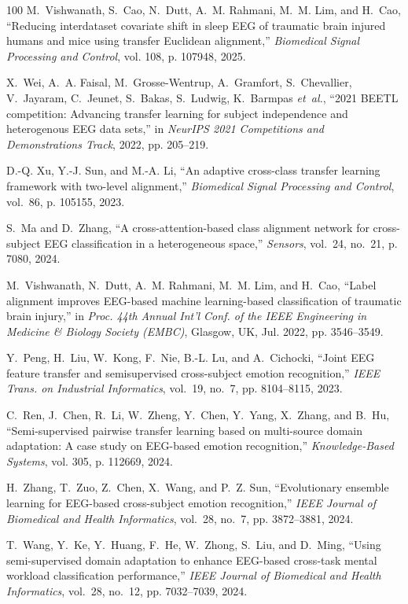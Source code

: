 \documentclass[journal]{IEEEtran}
\begin{document}
\begin{thebibliography}{100}
M.~Vishwanath, S.~Cao, N.~Dutt, A.~M. Rahmani, M.~M. Lim, and H.~Cao,
  ``Reducing interdataset covariate shift in sleep {EEG} of traumatic brain
  injured humans and mice using transfer {E}uclidean alignment,''
  \emph{Biomedical Signal Processing and Control}, vol. 108, p. 107948, 2025.

X.~Wei, A.~A. Faisal, M.~Grosse-Wentrup, A.~Gramfort, S.~Chevallier,
  V.~Jayaram, C.~Jeunet, S.~Bakas, S.~Ludwig, K.~Barmpas \emph{et~al.}, ``2021
  {BEETL} competition: Advancing transfer learning for subject independence and
  heterogenous {EEG} data sets,'' in \emph{{NeurIPS} 2021 Competitions and
  Demonstrations Track}, 2022, pp. 205--219.

D.-Q. Xu, Y.-J. Sun, and M.-A. Li, ``An adaptive cross-class transfer learning
  framework with two-level alignment,'' \emph{Biomedical Signal Processing and
  Control}, vol.~86, p. 105155, 2023.

S.~Ma and D.~Zhang, ``A cross-attention-based class alignment network for
  cross-subject {EEG} classification in a heterogeneous space,''
  \emph{Sensors}, vol.~24, no.~21, p. 7080, 2024.

M.~Vishwanath, N.~Dutt, A.~M. Rahmani, M.~M. Lim, and H.~Cao, ``Label alignment
  improves {EEG}-based machine learning-based classification of traumatic brain
  injury,'' in \emph{Proc. 44th Annual Int'l Conf. of the IEEE Engineering in
  Medicine \& Biology Society (EMBC)}, Glasgow, UK, Jul. 2022, pp. 3546--3549.

Y.~Peng, H.~Liu, W.~Kong, F.~Nie, B.-L. Lu, and A.~Cichocki, ``Joint {EEG}
  feature transfer and semisupervised cross-subject emotion recognition,''
  \emph{IEEE Trans. on Industrial Informatics}, vol.~19, no.~7, pp. 8104--8115,
  2023.

C.~Ren, J.~Chen, R.~Li, W.~Zheng, Y.~Chen, Y.~Yang, X.~Zhang, and B.~Hu,
  ``Semi-supervised pairwise transfer learning based on multi-source domain
  adaptation: A case study on {EEG}-based emotion recognition,''
  \emph{Knowledge-Based Systems}, vol. 305, p. 112669, 2024.

H.~Zhang, T.~Zuo, Z.~Chen, X.~Wang, and P.~Z. Sun, ``Evolutionary ensemble
  learning for {EEG}-based cross-subject emotion recognition,'' \emph{IEEE
  Journal of Biomedical and Health Informatics}, vol.~28, no.~7, pp.
  3872--3881, 2024.

T.~Wang, Y.~Ke, Y.~Huang, F.~He, W.~Zhong, S.~Liu, and D.~Ming, ``Using
  semi-supervised domain adaptation to enhance {EEG}-based cross-task mental
  workload classification performance,'' \emph{IEEE Journal of Biomedical and
  Health Informatics}, vol.~28, no.~12, pp. 7032--7039, 2024.


\end{thebibliography}
\end{document}

